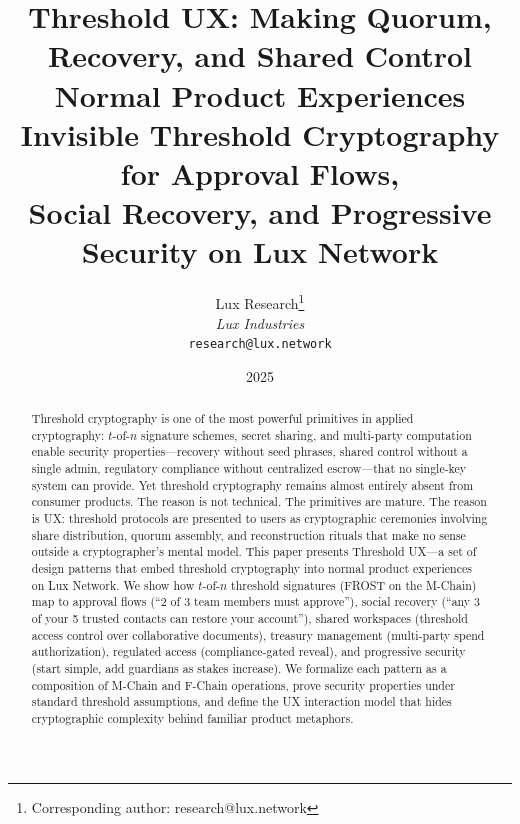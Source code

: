 \documentclass[11pt,a4paper]{article}
\title{\textbf{Threshold UX: Making Quorum, Recovery, and Shared Control Normal Product Experiences}\\[6pt]
\large Invisible Threshold Cryptography for Approval Flows,\\Social Recovery, and Progressive Security on Lux Network}
\author{
Lux Research\thanks{Corresponding author: research@lux.network}\\
\textit{Lux Industries}\\
\texttt{research@lux.network}
}
\date{2025}
\begin{document}
\luxcoverpage

\begin{abstract}
Threshold cryptography is one of the most powerful primitives in applied
cryptography: $t$-of-$n$ signature schemes, secret sharing, and multi-party
computation enable security properties---recovery without seed phrases, shared
control without a single admin, regulatory compliance without centralized
escrow---that no single-key system can provide. Yet threshold cryptography
remains almost entirely absent from consumer products. The reason is not
technical. The primitives are mature. The reason is UX: threshold protocols
are presented to users as cryptographic ceremonies involving share distribution,
quorum assembly, and reconstruction rituals that make no sense outside a
cryptographer's mental model. This paper presents Threshold UX---a set of
design patterns that embed threshold cryptography into normal product
experiences on Lux Network. We show how $t$-of-$n$ threshold signatures
(FROST on the M-Chain) map to approval flows (``2 of 3 team members must
approve''), social recovery (``any 3 of your 5 trusted contacts can restore
your account''), shared workspaces (threshold access control over collaborative
documents), treasury management (multi-party spend authorization), regulated
access (compliance-gated reveal), and progressive security (start simple,
add guardians as stakes increase). We formalize each pattern as a composition
of M-Chain and F-Chain operations, prove security properties under standard
threshold assumptions, and define the UX interaction model that hides
cryptographic complexity behind familiar product metaphors.
\end{abstract}












\end{document}
